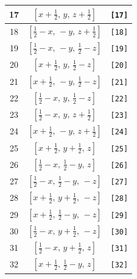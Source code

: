 \documentclass[fleqn,8pt]{jsarticle}
\begin{document}
\begin{longtable}{ccc}
17 & $\left[ x + \frac{1}{2},\, y,\, z + \frac{1}{2} \right]$ & {\tt [17]} \\ \hline
18 & $\left[ \frac{1}{2} - x,\, - y,\, z + \frac{1}{2} \right]$ & {\tt [18]} \\ \hline
19 & $\left[ \frac{1}{2} - x,\, - y,\, \frac{1}{2} - z \right]$ & {\tt [19]} \\ \hline
20 & $\left[ x + \frac{1}{2},\, y,\, \frac{1}{2} - z \right]$ & {\tt [20]} \\ \hline
21 & $\left[ x + \frac{1}{2},\, - y,\, \frac{1}{2} - z \right]$ & {\tt [21]} \\ \hline
22 & $\left[ \frac{1}{2} - x,\, y,\, \frac{1}{2} - z \right]$ & {\tt [22]} \\ \hline
23 & $\left[ \frac{1}{2} - x,\, y,\, z + \frac{1}{2} \right]$ & {\tt [23]} \\ \hline
24 & $\left[ x + \frac{1}{2},\, - y,\, z + \frac{1}{2} \right]$ & {\tt [24]} \\ \hline
25 & $\left[ x + \frac{1}{2},\, y + \frac{1}{2},\, z \right]$ & {\tt [25]} \\ \hline
26 & $\left[ \frac{1}{2} - x,\, \frac{1}{2} - y,\, z \right]$ & {\tt [26]} \\ \hline
27 & $\left[ \frac{1}{2} - x,\, \frac{1}{2} - y,\, - z \right]$ & {\tt [27]} \\ \hline
28 & $\left[ x + \frac{1}{2},\, y + \frac{1}{2},\, - z \right]$ & {\tt [28]} \\ \hline
29 & $\left[ x + \frac{1}{2},\, \frac{1}{2} - y,\, - z \right]$ & {\tt [29]} \\ \hline
30 & $\left[ \frac{1}{2} - x,\, y + \frac{1}{2},\, - z \right]$ & {\tt [30]} \\ \hline
31 & $\left[ \frac{1}{2} - x,\, y + \frac{1}{2},\, z \right]$ & {\tt [31]} \\ \hline
32 & $\left[ x + \frac{1}{2},\, \frac{1}{2} - y,\, z \right]$ & {\tt [32]} \\
\end{longtable}
\end{document}
